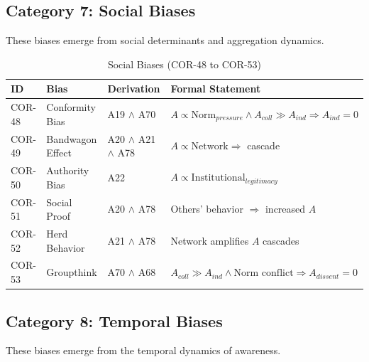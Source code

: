 
\subsection{Category 7: Social Biases}

These biases emerge from social determinants and aggregation dynamics.

\begin{table}[htbp]
\small
\centering
\caption{Social Biases (COR-48 to COR-53)}
\label{tab:cor-social}
\begin{tabular}{p{1.2cm}p{2.8cm}p{3.8cm}p{5cm}}
\toprule
\textbf{ID} & \textbf{Bias} & \textbf{Derivation} & \textbf{Formal Statement} \\
\midrule
COR-48 & Conformity Bias & A19 $\land$ A70 & $A \propto \text{Norm}_{pressure} \land A_{coll} \gg A_{ind} \Rightarrow A_{ind} = 0$ \\
COR-49 & Bandwagon Effect & A20 $\land$ A21 $\land$ A78 & $A \propto \text{Network} \Rightarrow$ cascade \\
COR-50 & Authority Bias & A22 & $A \propto \text{Institutional}_{legitimacy}$ \\
COR-51 & Social Proof & A20 $\land$ A78 & Others' behavior $\Rightarrow$ increased $A$ \\
COR-52 & Herd Behavior & A21 $\land$ A78 & Network amplifies $A$ cascades \\
COR-53 & Groupthink & A70 $\land$ A68 & $A_{coll} \gg A_{ind} \land \text{Norm conflict} \Rightarrow A_{dissent} = 0$ \\
\bottomrule
\end{tabular}
\end{table}


\subsection{Category 8: Temporal Biases}

These biases emerge from the temporal dynamics of awareness.

